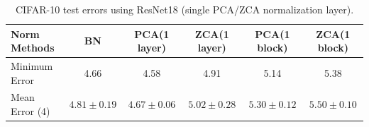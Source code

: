 \documentclass{article}
\begin{document}
\begin{table}[!htb]
\begin{centering}
\begin{tabular}{|l|c|c|c|c|c|}
\hline
Norm Methods          & BN        & PCA(1 layer)   & ZCA(1 layer)  & PCA(1 block)   & ZCA(1 block) \\ \hline
Minimum Error         & 4.66      &  4.58  &   4.91 &  5.14 &  5.38\\ \hline
Mean Error (4) & $4.81{\pm}0.19$  &  $4.67{\pm}0.06$  & $5.02{\pm}0.28$ & $5.30{\pm}0.12$ & $5.50{\pm}0.10$ \\ \hline
\end{tabular}
\caption{CIFAR-10 test errors using ResNet18 (single PCA/ZCA normalization layer).}
\end{centering}
\end{table}


\medskip
\small


\end{document}

